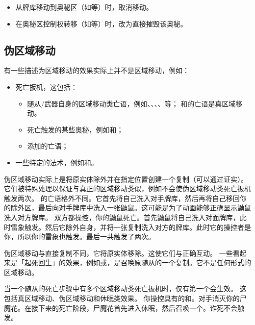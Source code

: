 \begin{itemize}
    \item 从牌库移动到奥秘区（如等）时，取消移动。
    \item 在奥秘区控制权转移（如等）时，改为直接摧毁该奥秘。
\end{itemize}

\subsection{伪区域移动}

有一些描述为区域移动的效果实际上并不是区域移动，例如：

\begin{itemize}
    \item 死亡扳机，这包括：
    \begin{itemize}
        \item 随从/武器自身的区域移动类亡语，例如、、、、等；
            \exception {}和的亡语是真区域移动。
        \item 死亡触发的某些奥秘，例如和；
        \item {}添加的亡语；
    \end{itemize}
    \item 一些特定的法术，例如和。
\end{itemize}

伪区域移动实际上是将原实体除外并在指定位置创建一个复制（可以通过证实）。它们被特殊处理以保证与真正的区域移动类似，例如不会使伪区域移动类死亡扳机触发两次。
\exception {}的亡语格外不同。它首先将自己洗入对手牌库，然后再将自己移回你的除外区，最后向对手牌库中洗入一张鼬鼠。这可能是为了动画能够正确显示鼬鼠洗入对方牌库。
\example 双方都操控，你的鼬鼠死亡。首先鼬鼠将自己洗入对面牌库，此时雷象触发。然后它除外自身，并将一张复制洗入对方的牌库。此时它的操控者是你，所以你的雷象也触发。最后一共触发了两次。

\notice 伪区域移动与直接复制不同，它将原实体移除。这使它们与正确互动。
\notice 一些看起来是「起死回生」的效果，例如或，是召唤原随从的一个复制。它不是任何形式的区域移动。

当一个随从的死亡步骤中有多个区域移动类死亡扳机时，仅有第一个会生效。
\notice 这包括真区域移动、伪区域移动和休眠类效果。
\example 你操控具有的和。对手消灭你的尸魔花。在接下来的死亡阶段，尸魔花首先进入休眠，然后召唤一个。诈死不会触发。

